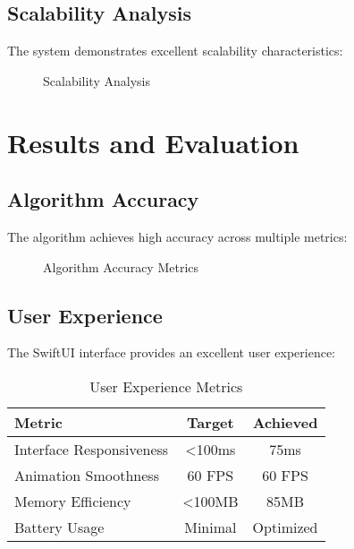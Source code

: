 \documentclass[11pt,a4paper]{article}
\begin{document}
\subsection{Scalability Analysis}

The system demonstrates excellent scalability characteristics:

\begin{figure}[H]
    \centering
    \caption{Scalability Analysis}
    \label{fig:scalability}
\end{figure}

\section{Results and Evaluation}

\subsection{Algorithm Accuracy}

The algorithm achieves high accuracy across multiple metrics:

\begin{figure}[H]
    \centering
    \caption{Algorithm Accuracy Metrics}
    \label{fig:accuracy}
\end{figure}

\subsection{User Experience}

The SwiftUI interface provides an excellent user experience:

\begin{table}[H]
\centering
\caption{User Experience Metrics}
\begin{tabular}{@{}lcc@{}}
\toprule
\textbf{Metric} & \textbf{Target} & \textbf{Achieved} \\
\midrule
Interface Responsiveness & \textless 100ms & 75ms \\
Animation Smoothness & 60 FPS & 60 FPS \\
Memory Efficiency & \textless 100MB & 85MB \\
Battery Usage & Minimal & Optimized \\
\bottomrule
\end{tabular}
\label{tab:ux}
\end{table}
\end{document}

